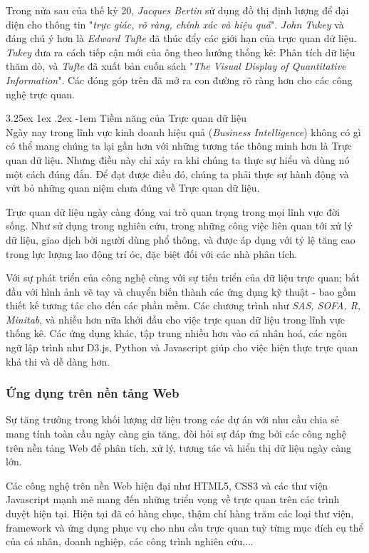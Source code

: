 \documentclass[12pt,a4paper]{article}
\makeatletter
\newcommand{\myparagraph}[1]{\paragraph{#1}\mbox{}\\} %
\renewcommand\paragraph{\@startsection{paragraph}{5}{\z@}%
  {3.25ex \@plus1ex \@minus.2ex}%
  {-1em}%
  {\normalfont\normalsize\bfseries}}
\makeatother
\begin{document}
Trong nửa sau của thế kỷ 20, \textit{Jacques Bertin} sử dụng đồ thị định lượng để đại diện cho thông tin "\textit{trực giác, rõ ràng, chính xác và hiệu quả}". \cite{wiki_history_1} \textit{John Tukey} và đáng chú ý hơn là \textit{Edward Tufte} đã thúc đẩy các giới hạn của trực quan dữ liệu. \textit{Tukey} đưa ra cách tiếp cận mới của ông theo hướng thống kê: Phân tích dữ liệu thăm dò, và \textit{Tufte} đã xuất bản cuốn sách "\textit{The Visual Display of Quantitative Information}". Các đóng góp trên đã mở ra con đường rõ ràng hơn cho các công nghệ trực quan.

\myparagraph{Tiềm năng của Trực quan dữ liệu}
Ngày nay trong lĩnh vực kinh doanh hiệu quả (\textit{Business Intelligence}) không có gì có thể mang chúng ta lại gần hơn với những tương tác thông minh hơn là Trực quan dữ liệu. Nhưng điều này chỉ xảy ra khi chúng ta thực sự hiểu và dùng nó một cách đúng đắn. Để đạt được điều đó, chúng ta phải thực sự hành động và vứt bỏ những quan niệm chưa đúng về Trực quan dữ liệu.

Trực quan dữ liệu ngày càng đóng vai trò quan trọng trong mọi lĩnh vực đời sống. Như sử dụng trong nghiên cứu, trong những công việc liên quan tới xử lý dữ liệu, giao dịch bởi người dùng phổ thông, và được áp dụng với tỷ lệ tăng cao trong lực lượng lao động trí óc, đặc biệt đối với các nhà phân tích.

Với sự phát triển của công nghệ cùng với sự tiến triển của dữ liệu trực quan; bắt đầu với hình ảnh vẽ tay và chuyển biến thành các ứng dụng kỹ thuật - bao gồm thiết kế tương tác cho đến các phần mềm. \cite{wiki_history_2} Các chương trình như \textit{SAS, SOFA, R, Minitab}, và nhiều hơn nữa khởi đầu cho việc trực quan dữ liệu trong lĩnh vực thống kê. Các ứng dụng khác, tập trung nhiều hơn vào cá nhân hoá, các ngôn ngữ lập trình như D3.js, Python và Javascript giúp cho việc hiện thực trực quan khả thi và dễ dàng hơn.

\subsubsection{Ứng dụng trên nền tảng Web}
Sự tăng trưởng trong khối lượng dữ liệu trong các dự án với nhu cầu chia sẻ mang tính toàn cầu ngày càng gia tăng, đòi hỏi sự đáp ứng bởi các công nghệ trên nền tảng Web để phân tích, xử lý, tương tác và hiển thị dữ liệu ngày càng lớn. 

Các công nghệ trên nền Web hiện đại như HTML5, CSS3 và các thư viện Javascript mạnh mẽ mang đến những triển vọng về trực quan trên các trình duyệt hiện tại. Hiện tại đã có hàng chục, thậm chí hàng trăm các loại thư viện, framework và ứng dụng phục vụ cho nhu cầu trực quan tuỳ từng mục đích cụ thể của cá nhân, doanh nghiệp, các công trình nghiên cứu,...
\end{document}
